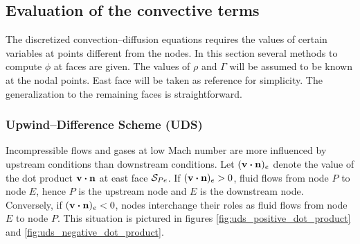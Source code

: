 
\subsection{Evaluation of the convective terms}

The discretized convection--diffusion equations requires the values of certain variables at points different from the nodes. In this section several methods to compute $\phi$ at faces are given. The values of $\rho$ and $\Gamma$ will be assumed to be known at the nodal points. East face will be taken as reference for simplicity. The generalization to the remaining faces is straightforward. 

\subsubsection{Upwind--Difference Scheme (UDS)}

Incompressible flows and gases at low Mach number are more influenced by upstream conditions than downstream conditions. Let $(\vb{v} \vdot \vb{n})_e$ denote the value of the dot product $\vb{v} \vdot \vb{n}$ at east face $\mathcal{S}_{Pe}$. If $(\vb{v} \vdot \vb{n})_e > 0$, fluid flows from node $P$ to node $E$, hence $P$ is the upstream node and $E$ is the downstream node. Conversely, if $(\vb{v} \vdot \vb{n})_e < 0$, nodes interchange their roles as fluid flows from node $E$ to node $P$. This situation is pictured in figures \ref{fig:uds_positive_dot_product} and \ref{fig:uds_negative_dot_product}.

